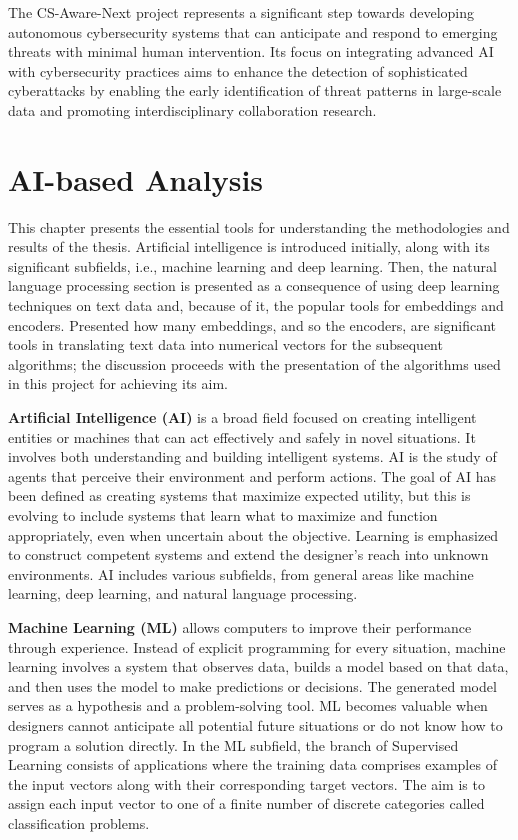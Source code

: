 The CS-Aware-Next project represents a significant step towards developing autonomous cybersecurity systems that can anticipate and respond to emerging threats with minimal human intervention. Its focus on integrating advanced AI with cybersecurity practices aims to enhance the detection of sophisticated cyberattacks by enabling the early identification of threat patterns in large-scale data and promoting interdisciplinary collaboration research.


\section{AI-based Analysis}\label{sec:ai-based-analysis}
This chapter presents the essential tools for understanding the methodologies and results of the thesis. Artificial intelligence is introduced initially, along with its significant subfields, i.e., machine learning and deep learning. Then, the natural language processing section is presented as a consequence of using deep learning techniques on text data and, because of it, the popular tools for embeddings and encoders. Presented how many embeddings, and so the encoders, are significant tools in translating text data into numerical vectors for the subsequent algorithms; the discussion proceeds with the presentation of the algorithms used in this project for achieving its aim.

\textbf{Artificial Intelligence (AI)} is a broad field focused on creating intelligent entities or machines that can act effectively and safely in novel situations. It involves both understanding and building intelligent systems. AI is the study of agents that perceive their environment and perform actions. The goal of AI has been defined as creating systems that maximize expected utility, but this is evolving to include systems that learn what to maximize and function appropriately, even when uncertain about the objective. Learning is emphasized to construct competent systems and extend the designer's reach into unknown environments. AI includes various subfields, from general areas like machine learning, deep learning, and natural language processing. \cite{russellnorvig2009}

\textbf{Machine Learning (ML)} allows computers to improve their performance through experience. Instead of explicit programming for every situation, machine learning involves a system that observes data, builds a model based on that data, and then uses the model to make predictions or decisions. The generated model serves as a hypothesis and a problem-solving tool. ML becomes valuable when designers cannot anticipate all potential future situations or do not know how to program a solution directly. In the ML subfield, the branch of Supervised Learning consists of applications where the training data comprises examples of the input vectors along with their corresponding target vectors. The aim is to assign each input vector to one of a finite number of discrete categories called classification problems. \cite{bishop2006}

